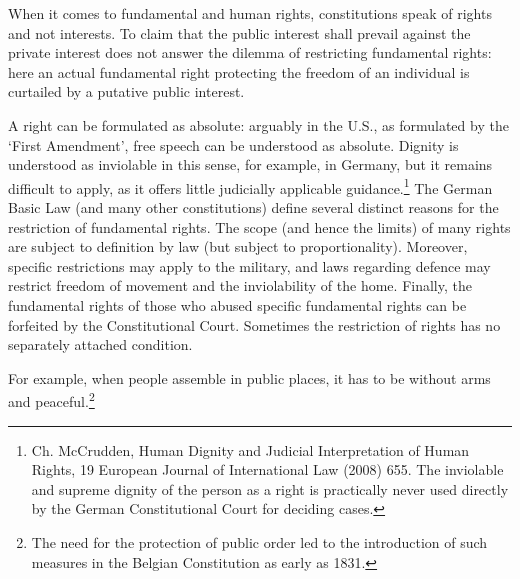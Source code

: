 \begin{multicols}{2}
\noi
When it comes to fundamental and human rights, constitutions speak of rights and not
interests. To claim that the public interest shall prevail against the private interest does not
answer the dilemma of restricting fundamental rights: here an actual fundamental right
protecting the freedom of an individual is curtailed by a putative public interest.

\vspace{.5cm}

\noi
A right can be formulated as absolute: arguably in the U.S., as formulated by the
‘First Amendment’, free speech can be understood as absolute. Dignity is understood as
inviolable in this sense, for example, in Germany, but it remains difficult to apply, as it offers
little judicially applicable guidance.\footnote{Ch. McCrudden, Human Dignity and Judicial Interpretation of Human Rights, 19 European Journal of
International Law (2008) 655. The inviolable and supreme dignity of the person as a right is practically never
used directly by the German Constitutional Court for deciding cases. } The German Basic Law (and many other constitutions)
define several distinct reasons for the restriction of fundamental rights. The scope (and hence
the limits) of many rights are subject to definition by law (but subject to proportionality).
Moreover, specific restrictions may apply to the military, and laws regarding defence may
restrict freedom of movement and the inviolability of the home. Finally, the fundamental
rights of those who abused specific fundamental rights can be forfeited by the
Constitutional Court. Sometimes the restriction of rights has no separately attached condition.

\vspace{-.1cm}

\noi
For example, when people assemble in public places, it has to be without arms and
peaceful.\footnote{The need for the protection of public order led to the introduction of such measures in the Belgian Constitution as early as 1831.}

\vspace{.1cm}


\vspace{.1cm}


\end{multicols}
